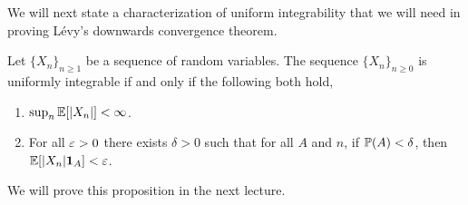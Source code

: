 We will next state a characterization of uniform integrability that we will need in proving L\'evy's downwards convergence theorem.
\begin{proposition}
    Let $\{X_n\}_{n \ge 1}$ be a sequence of random variables. The sequence $\{X_n\}_{n \ge 0}$ is uniformly integrable if and only if the following both hold,
    \begin{enumerate}
        \item $\sup_n {\mathbb{E}}[{\left\lvert X_n\right\rvert}] < \infty$.
        \item For all $\varepsilon >0$ there exists $\delta > 0$ such that for all $A$ and $n$, if ${\mathbb{P}}(A) <\delta$, then ${\mathbb{E}}[{\left\lvert X_n\right\rvert}{{\bf 1}}_A] < \varepsilon$.
    \end{enumerate}
\end{proposition}
We will prove this proposition in the next lecture.
